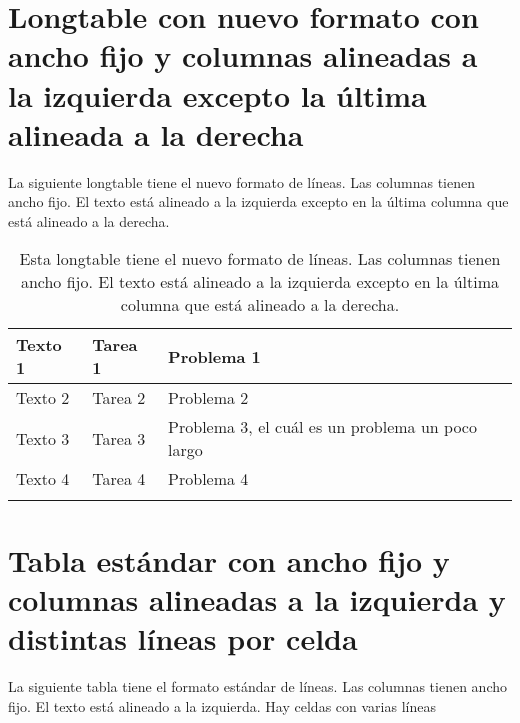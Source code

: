 \section*{Longtable con nuevo formato con ancho fijo y columnas alineadas a la izquierda excepto la última alineada a la derecha}

La siguiente longtable tiene el nuevo formato de líneas. Las columnas tienen ancho fijo. El texto está alineado a la izquierda excepto en la última columna que está alineado a la derecha.

\begin{center}
	\begin{longtable}{>{\raggedright\arraybackslash}p{2cm} >{\raggedright\arraybackslash}p{2.5cm} >{\raggedleft\arraybackslash}p{5cm}}
		\toprule[2pt]
		\textbf{Texto 1} & \textbf{Tarea 1} & \textbf{Problema 1} \\
		\midrule[1.5pt] \endhead
		Texto 2 & Tarea 2 & Problema 2 \\
		\hline
		Texto 3 & Tarea 3 & Problema 3, el cuál es un problema un poco largo \\
		\hline
		Texto 4 & Tarea 4 & Problema 4 \\
		\bottomrule[2pt]
		\caption[Longtable con formato con ancho fijo y columnas alineadas a la izquierda excepto la última alineada a la derecha]{Esta longtable tiene el nuevo formato de líneas. Las columnas tienen ancho fijo. El texto está alineado a la izquierda excepto en la última columna que está alineado a la derecha.}
		\label{table15}
	\end{longtable}
\end{center}

\section*{Tabla estándar con ancho fijo y columnas alineadas a la izquierda y distintas líneas por celda}

La siguiente tabla tiene el formato estándar de líneas. Las columnas tienen ancho fijo. El texto está alineado a la izquierda. Hay celdas con varias líneas

